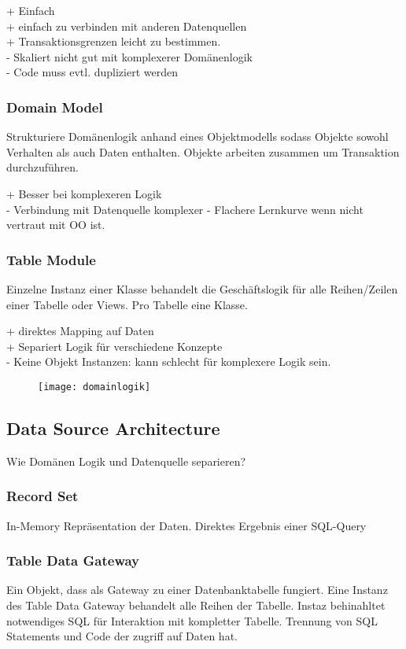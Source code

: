 + Einfach \\
+ einfach zu verbinden mit anderen Datenquellen \\
+ Transaktionsgrenzen leicht zu bestimmen. \\
- Skaliert nicht gut mit komplexerer Domänenlogik \\
- Code muss evtl. dupliziert werden

\subsubsection{Domain Model}
Strukturiere Domänenlogik anhand eines Objektmodells sodass Objekte sowohl Verhalten als auch Daten
enthalten. Objekte arbeiten zusammen um Transaktion durchzuführen.

+ Besser bei komplexeren Logik \\
- Verbindung mit Datenquelle komplexer
- Flachere Lernkurve wenn nicht vertraut mit OO ist.

\subsubsection{Table Module}
Einzelne Instanz einer Klasse behandelt die Geschäftslogik für alle Reihen/Zeilen
einer Tabelle oder Views. Pro Tabelle eine Klasse.

+ direktes Mapping auf Daten \\
+ Separiert Logik für verschiedene Konzepte \\
- Keine Objekt Instanzen: kann schlecht für komplexere Logik sein.

\begin{figure}[!h]
    \centering
    \texttt{[image: domainlogik]}
\end{figure}

\subsection{Data Source Architecture}
Wie Domänen Logik und Datenquelle separieren?
\subsubsection{Record Set}
In-Memory Repräsentation der Daten. Direktes Ergebnis einer SQL-Query

\subsubsection{Table Data Gateway}
Ein Objekt, dass als Gateway zu einer Datenbanktabelle fungiert. Eine Instanz des Table Data Gateway
behandelt alle Reihen der Tabelle. Instaz behinahltet notwendiges SQL für Interaktion mit
kompletter Tabelle.
Trennung von SQL Statements und Code der zugriff auf Daten hat.

